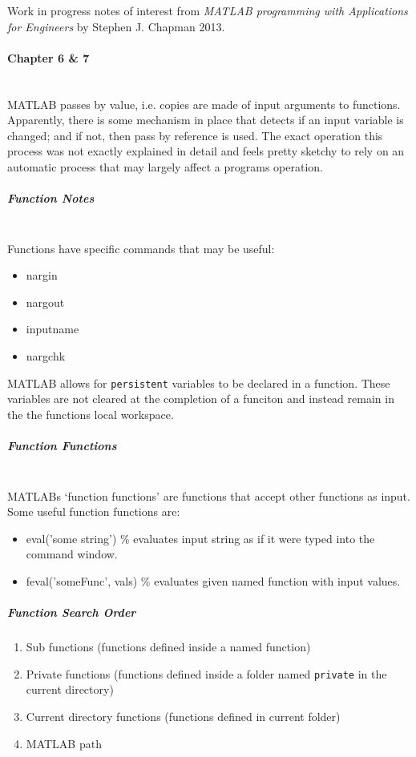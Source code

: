 \documentclass[12pt]{article}
\begin{document}
Work in progress notes of interest from \emph{MATLAB programming with Applications for Engineers} by Stephen J. Chapman 2013.

\paragraph{Chapter 6 \& 7} \ \\
MATLAB passes by value, i.e. copies are made of input arguments to functions. 
Apparently, there is some mechanism in place that detects if an input variable is changed; and if not, then pass by reference is used.
The exact operation this process was not exactly explained in detail and feels pretty sketchy to rely on an automatic process that may largely affect a programs operation.

\subparagraph{Function Notes} \ \\
Functions have specific commands that may be useful:
\begin{itemize}
\itemsep 0em
\item nargin
\item nargout
\item inputname
\item nargchk
\end{itemize}

MATLAB allows for \verb|persistent| variables to be declared in a function.
These variables are not cleared at the completion of a funciton and instead remain in the the functions local workspace.

\subparagraph{Function Functions} \ \\
MATLABs `function functions' are functions that accept other functions as input.
Some useful function functions are:
\begin{itemize}
\item eval('some string') \% evaluates input string as if it were typed into the command window.
\item feval('someFunc', vals) \% evaluates given named function with input values.
\end{itemize}

\subparagraph{Function Search Order}
\begin{enumerate}
\item Sub functions (functions defined inside a named function)
\item Private functions (functions defined inside a folder named \verb|private| in the current directory)
\item Current directory functions (functions defined in current folder)
\item MATLAB path
\end{enumerate}
\end{document}

